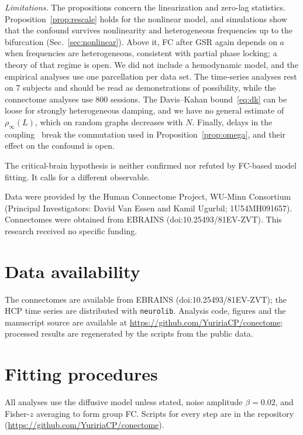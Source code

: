 \documentclass[aip,cha,reprint,amsmath,amssymb]{revtex4-2}
\theoremstyle{remark}
\begin{document}
\emph{Limitations.} The propositions concern the linearization and zero-lag statistics. Proposition~\ref{prop:rescale} holds for the nonlinear model, and simulations show that the confound survives nonlinearity and heterogeneous frequencies up to the bifurcation (Sec.~\ref{sec:nonlinear}). Above it, FC after GSR again depends on $a$ when frequencies are heterogeneous, consistent with partial phase locking; a theory of that regime is open. We did not include a hemodynamic model, and the empirical analyses use one parcellation per data set. The time-series analyses rest on 7 subjects and should be read as demonstrations of possibility, while the connectome analyses use 800 sessions. The Davis--Kahan bound~\eqref{eq:dk} can be loose for strongly heterogeneous damping, and we have no general estimate of $\rho_\infty(L)$, which on random graphs decreases with $N$. Finally, delays in the coupling~\cite{PonceAlvarez2024} break the commutation used in Proposition~\ref{prop:omega}, and their effect on the confound is open.

The critical-brain hypothesis is neither confirmed nor refuted by FC-based model fitting. It calls for a different observable.

\begin{acknowledgments}
Data were provided by the Human Connectome Project, WU-Minn Consortium (Principal Investigators: David Van Essen and Kamil Ugurbil; 1U54MH091657). Connectomes were obtained from EBRAINS (doi:10.25493/81EV-ZVT). This research received no specific funding.
\end{acknowledgments}

\section*{Data availability}
The connectomes are available from EBRAINS (doi:10.25493/81EV-ZVT); the HCP time series are distributed with \texttt{neurolib}. Analysis code, figures and the manuscript source are available at \url{https://github.com/YuririaCP/conectome}; processed results are regenerated by the scripts from the public data.


\appendix

\section{Fitting procedures}\label{app:methods}

All analyses use the diffusive model unless stated, noise amplitude $\beta=0.02$, and Fisher-$z$ averaging to form group FC. Scripts for every step are in the repository (\url{https://github.com/YuririaCP/conectome}).
\end{document}
